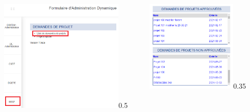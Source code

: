 \documentclass[aspectratio=169]{beamer}%
\let\note\relax
\begin{document}
\begin{frame}
\transwipe 
\begin{columns}
  

    \centering
    \begin{annotate}{\includegraphics[width=0.85\textwidth]{home_list}}{0.5}
    \end{annotate}

  

    \centering
    \begin{annotate}{\includegraphics[width=0.75\textwidth]{ Liste-demandes-projets-Nouveau}}{0.35}
        

\end{annotate}
\end{columns}
\end{frame}
\end{document}
